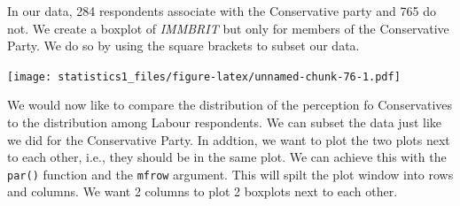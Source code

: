 \documentclass[]{article}
\newenvironment{Shaded}{\begin{snugshade}}{\end{snugshade}}
\newcommand{\KeywordTok}[1]{\textcolor[rgb]{0.13,0.29,0.53}{\textbf{#1}}}
\newcommand{\DataTypeTok}[1]{\textcolor[rgb]{0.13,0.29,0.53}{#1}}
\newcommand{\DecValTok}[1]{\textcolor[rgb]{0.00,0.00,0.81}{#1}}
\newcommand{\StringTok}[1]{\textcolor[rgb]{0.31,0.60,0.02}{#1}}
\newcommand{\CommentTok}[1]{\textcolor[rgb]{0.56,0.35,0.01}{\textit{#1}}}
\newcommand{\OtherTok}[1]{\textcolor[rgb]{0.56,0.35,0.01}{#1}}
\newcommand{\OperatorTok}[1]{\textcolor[rgb]{0.81,0.36,0.00}{\textbf{#1}}}
\newcommand{\NormalTok}[1]{#1}
\theoremstyle{definition}
\theoremstyle{definition}
\theoremstyle{definition}
\theoremstyle{remark}
\begin{document}
In our data, 284 respondents associate with the Conservative party and
765 do not. We create a boxplot of \emph{IMMBRIT} but only for members
of the Conservative Party. We do so by using the square brackets to
subset our data.

\begin{Shaded}
\end{Shaded}

\texttt{[image: statistics1\_files/figure-latex/unnamed-chunk-76-1.pdf]}

We would now like to compare the distribution of the perception fo
Conservatives to the distribution among Labour respondents. We can
subset the data just like we did for the Conservative Party. In addtion,
we want to plot the two plots next to each other, i.e., they should be
in the same plot. We can achieve this with the \texttt{par()} function
and the \texttt{mfrow} argument. This will spilt the plot window into
rows and columns. We want 2 columns to plot 2 boxplots next to each
other.

\begin{Shaded}
\end{Shaded}
\end{document}
